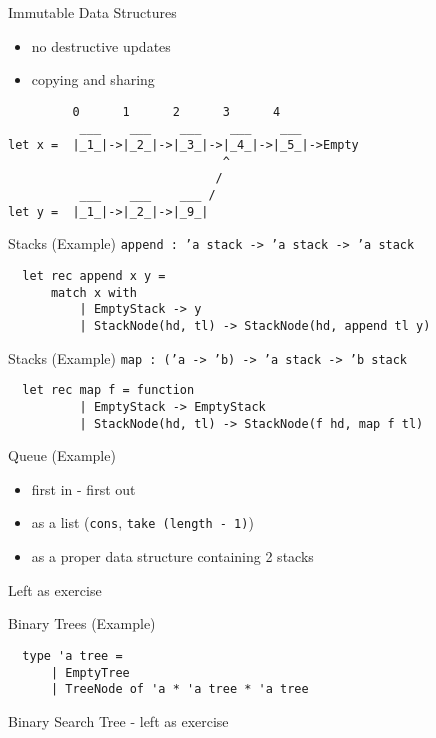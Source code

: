 \documentclass{beamer}
\begin{document}
\begin{frame}[fragile]{Immutable Data Structures}
  \begin{itemize}[<+->]
    \item no destructive updates
    \item copying and sharing
  \end{itemize}
  \pause
  \begin{verbatim}
         0      1      2      3      4
          ___    ___    ___    ___    ___ 
let x =  |_1_|->|_2_|->|_3_|->|_4_|->|_5_|->Empty
                              ^
                             /
          ___    ___    ___ /
let y =  |_1_|->|_2_|->|_9_|
  \end{verbatim}
\end{frame}

\begin{frame}[fragile]{Stacks (Example)}
  \texttt{append : 'a stack -> 'a stack -> 'a stack}
  \pause
  \small
  \begin{verbatim}
  let rec append x y =
      match x with
          | EmptyStack -> y
          | StackNode(hd, tl) -> StackNode(hd, append tl y)
  \end{verbatim}
\end{frame}

\begin{frame}[fragile]{Stacks (Example)}
  \texttt{map : ('a -> 'b) -> 'a stack -> 'b stack}
  \pause
  \small
  \begin{verbatim}
  let rec map f = function
          | EmptyStack -> EmptyStack
          | StackNode(hd, tl) -> StackNode(f hd, map f tl)
  \end{verbatim}
\end{frame}

\begin{frame}{Queue (Example)}
  \begin{itemize}[<+->]
    \item first in - first out
    \item as a list (\texttt{cons}, \texttt{take (length - 1)})
    \item as a proper data structure containing 2 stacks
  \end{itemize}
  \pause
  Left as exercise
\end{frame}

\begin{frame}[fragile]{Binary Trees (Example)}
  \begin{verbatim}
  type 'a tree =
      | EmptyTree
      | TreeNode of 'a * 'a tree * 'a tree
  \end{verbatim}
  \pause
  Binary Search Tree - left as exercise
\end{frame}
\end{document}
